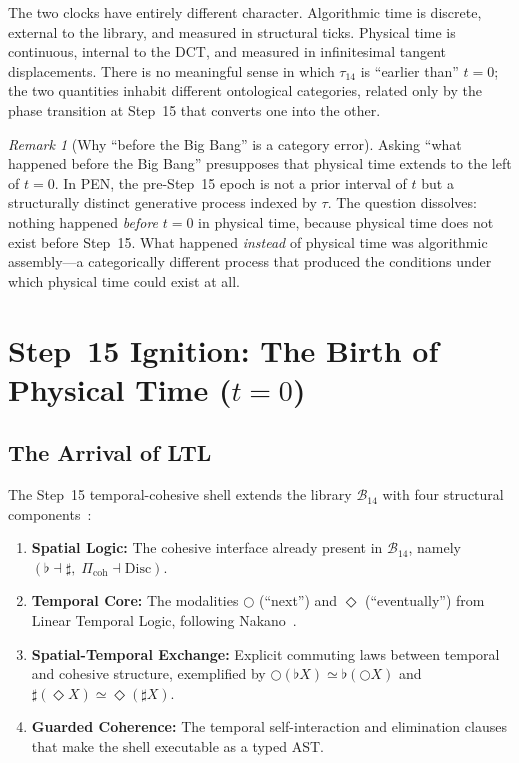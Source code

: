 \documentclass[11pt,a4paper]{article}
\theoremstyle{plain}
\theoremstyle{definition}
\theoremstyle{remark}
\newtheorem{remark}[theorem]{Remark}
\newcommand{\B}{\mathcal{B}}
\newcommand{\Disc}{\mathrm{Disc}}
\newcommand{\nextmod}{\bigcirc}
\newcommand{\eventually}{\Diamond}
\begin{document}
The two clocks have entirely different character.
Algorithmic time is discrete, external to the library, and measured in structural ticks.
Physical time is continuous, internal to the DCT, and measured in infinitesimal tangent displacements.
There is no meaningful sense in which $\tau_{14}$ is ``earlier than'' $t = 0$; the two quantities inhabit different ontological categories, related only by the phase transition at Step~15 that converts one into the other.

\begin{remark}[Why ``before the Big Bang'' is a category error]
\label{rem:category-error}
Asking ``what happened before the Big Bang'' presupposes that physical time extends to the left of $t = 0$.
In PEN, the pre-Step~15 epoch is not a prior interval of $t$ but a structurally distinct generative process indexed by $\tau$.
The question dissolves: nothing happened \emph{before} $t = 0$ in physical time, because physical time does not exist before Step~15.
What happened \emph{instead} of physical time was algorithmic assembly---a categorically different process that produced the conditions under which physical time could exist at all.
\end{remark}


\section{Step~15 Ignition: The Birth of Physical Time \texorpdfstring{($t = 0$)}{(t = 0)}}
\label{sec:ignition}

\subsection{The Arrival of LTL}
\label{sec:ltl}

The Step~15 temporal-cohesive shell extends the library $\B_{14}$ with four structural components~\cite{pen}:

\begin{enumerate}[label=(\arabic*), nosep]
    \item \textbf{Spatial Logic:} The cohesive interface already present in $\B_{14}$, namely $(\flat \dashv \sharp,\; \Pi_{\mathrm{coh}} \dashv \Disc)$.
    \item \textbf{Temporal Core:} The modalities $\nextmod$ (``next'') and $\eventually$ (``eventually'') from Linear Temporal Logic, following Nakano~\cite{nakano}.
    \item \textbf{Spatial-Temporal Exchange:} Explicit commuting laws between temporal and cohesive structure, exemplified by $\nextmod(\flat X) \simeq \flat(\nextmod X)$ and $\sharp(\eventually X) \simeq \eventually(\sharp X)$.
    \item \textbf{Guarded Coherence:} The temporal self-interaction and elimination clauses that make the shell executable as a typed AST.
\end{enumerate}
\end{document}
